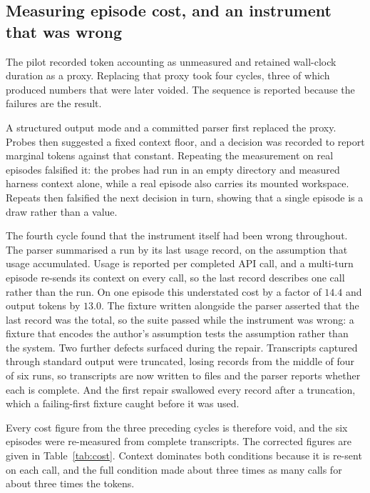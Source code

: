 \documentclass[11pt,a4paper]{article}
\begin{document}
\subsection{Measuring episode cost, and an instrument that was wrong}

The pilot recorded token accounting as unmeasured and retained wall-clock duration as
a proxy. Replacing that proxy took four cycles, three of which produced numbers that
were later voided. The sequence is reported because the failures are the result.

A structured output mode and a committed parser first replaced the proxy. Probes then
suggested a fixed context floor, and a decision was recorded to report marginal tokens
against that constant. Repeating the measurement on real episodes falsified it: the
probes had run in an empty directory and measured harness context alone, while a real
episode also carries its mounted workspace. Repeats then falsified the next decision in
turn, showing that a single episode is a draw rather than a value.

The fourth cycle found that the instrument itself had been wrong throughout. The parser
summarised a run by its last usage record, on the assumption that usage accumulated.
Usage is reported per completed API call, and a multi-turn episode re-sends its context
on every call, so the last record describes one call rather than the run. On one
episode this understated cost by a factor of $14.4$ and output tokens by $13.0$. The
fixture written alongside the parser asserted that the last record was the total, so
the suite passed while the instrument was wrong: a fixture that encodes the author's
assumption tests the assumption rather than the system. Two further defects surfaced
during the repair. Transcripts captured through standard output were truncated, losing
records from the middle of four of six runs, so transcripts are now written to files
and the parser reports whether each is complete. And the first repair swallowed every
record after a truncation, which a failing-first fixture caught before it was used.

Every cost figure from the three preceding cycles is therefore void, and the six
episodes were re-measured from complete transcripts. The corrected figures are given in
Table~\ref{tab:cost}. Context dominates both conditions because it is re-sent on each
call, and the full condition made about three times as many calls for about three times
the tokens.
\end{document}

